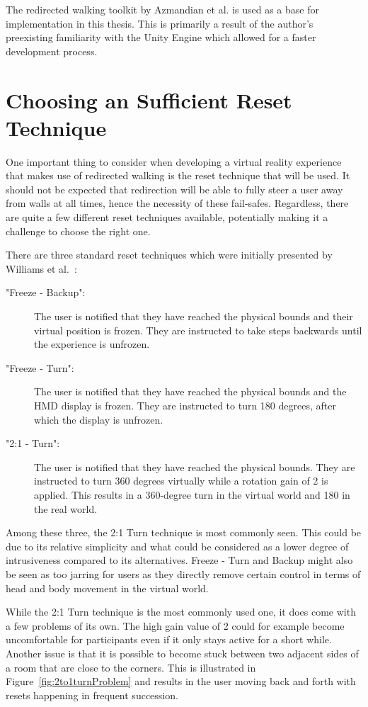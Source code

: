 The redirected walking toolkit by Azmandian et al. is used as a base for implementation in this thesis. This is primarily a result of the author's preexisting familiarity with the Unity Engine which allowed for a faster development process.

\section{Choosing an Sufficient Reset Technique}
One important thing to consider when developing a virtual reality experience that makes use of redirected walking is the reset technique that will be used. It should not be expected that redirection will be able to fully steer a user away from walls at all times, hence the necessity of these fail-safes. Regardless, there are quite a few different reset techniques available, potentially making it a challenge to choose the right one. 

There are three standard reset techniques which were initially presented by Williams et al.~\cite{williams2007exploring}:
\begin{description}
    \item["Freeze - Backup": ] The user is notified that they have reached the physical bounds and their virtual position is frozen. They are instructed to take steps backwards until the experience is unfrozen. 
    \item["Freeze - Turn": ] The user is notified that they have reached the physical bounds and the HMD display is frozen. They are instructed to turn 180 degrees, after which the display is unfrozen. 
    \item["2:1 - Turn": ] The user is notified that they have reached the physical bounds. They are instructed to turn 360 degrees virtually while a rotation gain of 2 is applied. This results in a 360-degree turn in the virtual world and 180 in the real world.
\end{description}

Among these three, the 2:1 Turn technique is most commonly seen. This could be due to its relative simplicity and what could be considered as a lower degree of intrusiveness compared to its alternatives. Freeze - Turn and Backup might also be seen as too jarring for users as they directly remove certain control in terms of head and body movement in the virtual world.

While the 2:1 Turn technique is the most commonly used one, it does come with a few problems of its own. The high gain value of 2 could for example become uncomfortable for participants even if it only stays active for a short while. Another issue is that it is possible to become stuck between two adjacent sides of a room that are close to the corners. This is illustrated in Figure~\ref{fig:2to1turnProblem} and results in the user moving back and forth with resets happening in frequent succession.  

